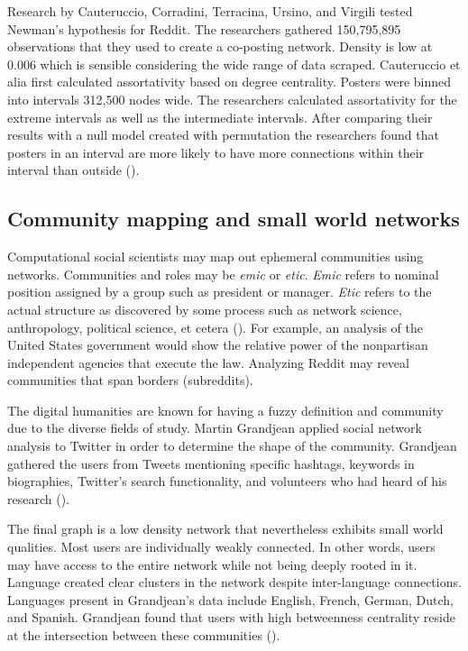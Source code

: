 \documentclass[12pt, a4paper]{article}
\begin{document}
Research by Cauteruccio, Corradini, Terracina, Ursino, and Virgili tested Newman's hypothesis for Reddit. The researchers gathered 150,795,895 observations that they used to create a co-posting network. Density is low at 0.006 which is sensible considering the wide range of data scraped. Cauteruccio et alia first calculated assortativity based on degree centrality. Posters were binned into intervals 312,500 nodes wide. The researchers calculated assortativity for the extreme intervals as well as the intermediate intervals. After comparing their results with a null model created with permutation the researchers found that posters in an interval are more likely to have more connections within their interval than outside (\cite{cauteruccio2020}).

\subsection{Community mapping and small world networks}
Computational social scientists may map out ephemeral communities using networks. Communities and roles may be \textit{emic} or \textit{etic}. \textit{Emic} refers to nominal position assigned by a group such as president or manager. \textit{Etic} refers to the actual structure as discovered by some process such as network science, anthropology, political science, et cetera (\cite{kadushin2011}). For example, an analysis of the United States government would show the relative power of the nonpartisan independent agencies that execute the law. Analyzing Reddit may reveal communities that span borders (subreddits).

The digital humanities are known for having a fuzzy definition and community due to the diverse fields of study. Martin Grandjean applied social network analysis to Twitter in order to determine the shape of the community. Grandjean gathered the users from Tweets mentioning specific hashtags, keywords in biographies, Twitter's search functionality, and volunteers who had heard of his research (\cite{grandjean2016}).

The final graph is a low density network that nevertheless exhibits small world qualities. Most users are individually weakly connected. In other words, users may have access to the entire network while not being deeply rooted in it. Language created clear clusters in the network despite inter-language connections. Languages present in Grandjean's data include English, French, German, Dutch, and Spanish. Grandjean found that users with high betweenness centrality reside at the intersection between these communities (\cite{grandjean2016}).
\end{document}
